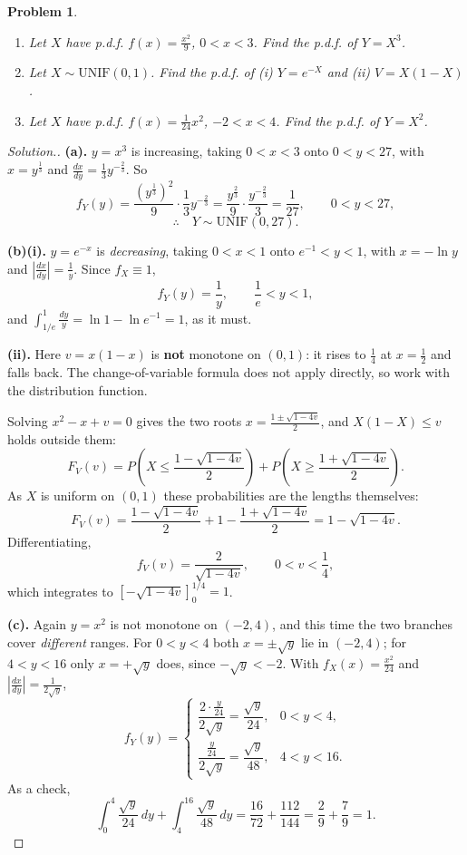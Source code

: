 \documentclass[12pt,a4paper]{report}
\theoremstyle{definition}
\theoremstyle{plain}
\newtheorem{problemx}{Problem}[section]
\newenvironment{problem}{\begin{problemx}}{\end{problemx}}
\newenvironment{solution}
  {\renewcommand{\qedsymbol}{}\begin{proof}[\textit{Solution}.]}
  {\end{proof}}
\begin{document}
\begin{problem}
\begin{enumerate}
\item[(a).] Let $X$ have p.d.f. $f(x)=\frac{x^2}{9}$, $0<x<3$. Find the p.d.f. of
$Y=X^3$.
\item[(b).] Let $X\sim\text{UNIF}(0,1)$. Find the p.d.f. of
(i) $Y=e^{-X}$ and (ii) $V=X(1-X)$.
\item[(c).] Let $X$ have p.d.f. $f(x)=\frac{1}{24}x^2$, $-2<x<4$. Find the p.d.f.
of $Y=X^2$.
\end{enumerate}
\end{problem}

\begin{solution}
\textbf{(a).} $y=x^3$ is increasing, taking $0<x<3$ onto $0<y<27$, with
$x=y^{\frac13}$ and $\frac{dx}{dy}=\frac13y^{-\frac23}$. So
\[f_Y(y)=\frac{\left(y^{\frac13}\right)^2}{9}\cdot\frac{1}{3}y^{-\frac23}
=\frac{y^{\frac23}}{9}\cdot\frac{y^{-\frac23}}{3}=\frac{1}{27},
\qquad 0<y<27,\]
\[\therefore\quad Y\sim\text{UNIF}(0,27).\]

\textbf{(b)(i).} $y=e^{-x}$ is \emph{decreasing}, taking $0<x<1$ onto
$e^{-1}<y<1$, with $x=-\ln y$ and $\left|\frac{dx}{dy}\right|=\frac{1}{y}$. Since
$f_X\equiv1$,
\[f_Y(y)=\frac{1}{y},\qquad \frac{1}{e}<y<1,\]
and $\int_{1/e}^1\frac{dy}{y}=\ln1-\ln e^{-1}=1$, as it must.

\textbf{(ii).} Here $v=x(1-x)$ is \textbf{not} monotone on $(0,1)$: it rises to
$\frac14$ at $x=\frac12$ and falls back. The change-of-variable formula does not
apply directly, so work with the distribution function.

Solving $x^2-x+v=0$ gives the two roots $x=\frac{1\pm\sqrt{1-4v}}{2}$, and
$X(1-X)\leq v$ holds outside them:
\[F_V(v)=P\left(X\leq\frac{1-\sqrt{1-4v}}{2}\right)
+P\left(X\geq\frac{1+\sqrt{1-4v}}{2}\right).\]
As $X$ is uniform on $(0,1)$ these probabilities are the lengths themselves:
\[F_V(v)=\frac{1-\sqrt{1-4v}}{2}+1-\frac{1+\sqrt{1-4v}}{2}=1-\sqrt{1-4v}.\]
Differentiating,
\[f_V(v)=\frac{2}{\sqrt{1-4v}},\qquad 0<v<\frac14,\]
which integrates to $\left[-\sqrt{1-4v}\right]_0^{1/4}=1$.

\textbf{(c).} Again $y=x^2$ is not monotone on $(-2,4)$, and this time the two
branches cover \emph{different} ranges. For $0<y<4$ both $x=\pm\sqrt y$ lie in
$(-2,4)$; for $4<y<16$ only $x=+\sqrt y$ does, since $-\sqrt y<-2$. With
$f_X(x)=\frac{x^2}{24}$ and $\left|\frac{dx}{dy}\right|=\frac{1}{2\sqrt y}$,
\[f_Y(y)=\begin{cases}
\dfrac{2\cdot\frac{y}{24}}{2\sqrt y}=\dfrac{\sqrt y}{24}, & 0<y<4,\\[10pt]
\dfrac{\frac{y}{24}}{2\sqrt y}=\dfrac{\sqrt y}{48}, & 4<y<16.
\end{cases}\]
As a check,
\[\int_0^4\frac{\sqrt y}{24}\,dy+\int_4^{16}\frac{\sqrt y}{48}\,dy
=\frac{16}{72}+\frac{112}{144}=\frac{2}{9}+\frac{7}{9}=1.\]


\end{solution}
\end{document}
